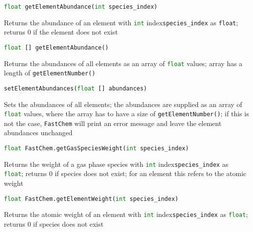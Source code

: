 \documentclass[numbers=noenddot]{aux/fcmanual}
\newcommand{\fc}{\texttt{FastChem}\xspace}
\begin{document}
\lstinline[language=Python]!float getElementAbundance(int species_index)!
\begin{addmargin}[25pt]{0pt}
	Returns the abundance of an element with \lstinline[language=Python]!int! index\footnotemark[\value{footnote}] \lstinline!species_index! as \lstinline!float!; returns 0 if the element does not exist
\end{addmargin}


\bigbreak

\lstinline[language=Python]!float [] getElementAbundance()!
\begin{addmargin}[25pt]{0pt}
	Returns the abundances of all elements as an array of \lstinline[language=Python]!float! values; array has a length of \lstinline!getElementNumber()!
\end{addmargin}

\bigbreak

\lstinline[language=Python]!setElementAbundances(float [] abundances)!
\begin{addmargin}[25pt]{0pt}
	Sets the abundances of all elements; the abundances are supplied as an array of \lstinline[language=Python]!float! values, where the array has to have a size of \lstinline[language=Python]!getElementNumber()!; if this is not the case, \fc will print an error message and leave the element abundances unchanged
\end{addmargin}

\bigbreak

\lstinline[language=Python]!float FastChem.getGasSpeciesWeight(int species_index)!
\begin{addmargin}[25pt]{0pt}
	Returns the weight of a gas phase species with \lstinline[language=Python]!int! index\footnotemark[\value{footnote}] \lstinline!species_index! as \lstinline[language=Python]!float!; returns 0 if species does not exist; for an element this refers to the atomic weight
\end{addmargin}

\bigbreak

\lstinline[language=Python]!float FastChem.getElementWeight(int species_index)!
\begin{addmargin}[25pt]{0pt}
	Returns the atomic weight of an element with \lstinline[language=Python]!int! index\footnotemark[\value{footnote}] \lstinline!species_index! as \lstinline[language=Python]!float!; returns 0 if species does not exist
\end{addmargin}

\bigbreak
\end{document}

